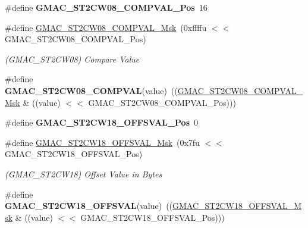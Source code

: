 \begin{DoxyCompactItemize}
\item 
\mbox{\label{group__SAMV71__GMAC_ga90fe97c6545f8b1a9f3fbed95bce292f}} 
\#define {\bfseries G\+M\+A\+C\+\_\+\+S\+T2\+C\+W08\+\_\+\+C\+O\+M\+P\+V\+A\+L\+\_\+\+Pos}~16
\item 
\mbox{\label{group__SAMV71__GMAC_ga92addb2e9a0d41895f1dab123e6c070f}} 
\#define \mbox{\hyperlink{group__SAMV71__GMAC_ga92addb2e9a0d41895f1dab123e6c070f}{G\+M\+A\+C\+\_\+\+S\+T2\+C\+W08\+\_\+\+C\+O\+M\+P\+V\+A\+L\+\_\+\+Msk}}~(0xffffu $<$$<$ G\+M\+A\+C\+\_\+\+S\+T2\+C\+W08\+\_\+\+C\+O\+M\+P\+V\+A\+L\+\_\+\+Pos)
\begin{DoxyCompactList}\small\item\em (G\+M\+A\+C\+\_\+\+S\+T2\+C\+W08) Compare Value \end{DoxyCompactList}\item 
\mbox{\label{group__SAMV71__GMAC_gac7bb22be90e2083ae50791c02558d14b}} 
\#define {\bfseries G\+M\+A\+C\+\_\+\+S\+T2\+C\+W08\+\_\+\+C\+O\+M\+P\+V\+AL}(value)~((\mbox{\hyperlink{group__SAMV71__GMAC_ga92addb2e9a0d41895f1dab123e6c070f}{G\+M\+A\+C\+\_\+\+S\+T2\+C\+W08\+\_\+\+C\+O\+M\+P\+V\+A\+L\+\_\+\+Msk}} \& ((value) $<$$<$ G\+M\+A\+C\+\_\+\+S\+T2\+C\+W08\+\_\+\+C\+O\+M\+P\+V\+A\+L\+\_\+\+Pos)))
\item 
\mbox{\label{group__SAMV71__GMAC_ga02e7f5470d3163c67fa5af9a19ae26a8}} 
\#define {\bfseries G\+M\+A\+C\+\_\+\+S\+T2\+C\+W18\+\_\+\+O\+F\+F\+S\+V\+A\+L\+\_\+\+Pos}~0
\item 
\mbox{\label{group__SAMV71__GMAC_ga2d765aad9c2975eb3297ba1ac64ab5b7}} 
\#define \mbox{\hyperlink{group__SAMV71__GMAC_ga2d765aad9c2975eb3297ba1ac64ab5b7}{G\+M\+A\+C\+\_\+\+S\+T2\+C\+W18\+\_\+\+O\+F\+F\+S\+V\+A\+L\+\_\+\+Msk}}~(0x7fu $<$$<$ G\+M\+A\+C\+\_\+\+S\+T2\+C\+W18\+\_\+\+O\+F\+F\+S\+V\+A\+L\+\_\+\+Pos)
\begin{DoxyCompactList}\small\item\em (G\+M\+A\+C\+\_\+\+S\+T2\+C\+W18) Offset Value in Bytes \end{DoxyCompactList}\item 
\mbox{\label{group__SAMV71__GMAC_ga65af16da3d122731540633c21a99f63b}} 
\#define {\bfseries G\+M\+A\+C\+\_\+\+S\+T2\+C\+W18\+\_\+\+O\+F\+F\+S\+V\+AL}(value)~((\mbox{\hyperlink{group__SAMV71__GMAC_ga2d765aad9c2975eb3297ba1ac64ab5b7}{G\+M\+A\+C\+\_\+\+S\+T2\+C\+W18\+\_\+\+O\+F\+F\+S\+V\+A\+L\+\_\+\+Msk}} \& ((value) $<$$<$ G\+M\+A\+C\+\_\+\+S\+T2\+C\+W18\+\_\+\+O\+F\+F\+S\+V\+A\+L\+\_\+\+Pos)))

\end{DoxyCompactItemize}
